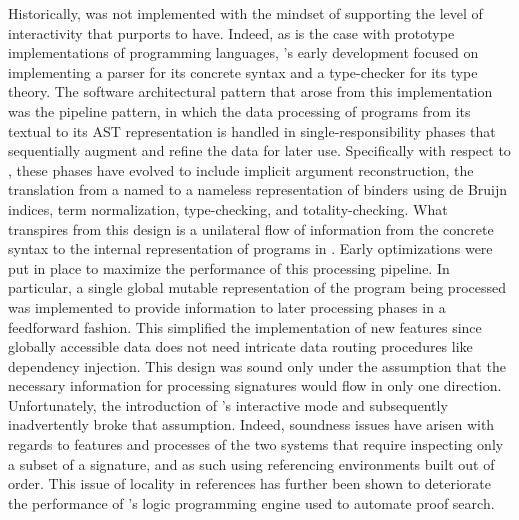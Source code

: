 Historically, \Beluga was not implemented with the mindset of supporting the level of interactivity that \Harpoon purports to have.
Indeed, as is the case with prototype implementations of programming languages, \Beluga's early development focused on implementing a parser for its concrete syntax and a type-checker for its type theory.
The software architectural pattern that arose from this implementation was the pipeline pattern, in which the data processing of programs from its textual to its \ac{AST} representation is handled in single-responsibility phases that sequentially augment and refine the data for later use.
Specifically with respect to \Beluga, these phases have evolved to include implicit argument reconstruction, the translation from a named to a nameless representation of binders using de Bruijn indices, term normalization, type-checking, and totality-checking.
What transpires from this design is a unilateral flow of information from the concrete syntax to the internal representation of programs in \Beluga.
Early optimizations were put in place to maximize the performance of this processing pipeline.
In particular, a single global mutable representation of the \Beluga program being processed was implemented to provide information to later processing phases in a feedforward fashion.
This simplified the implementation of new features since globally accessible data does not need intricate data routing procedures like dependency injection.
This design was sound only under the assumption that the necessary information for processing \Beluga signatures would flow in only one direction.
Unfortunately, the introduction of \Beluga's interactive mode and subsequently \Harpoon inadvertently broke that assumption.
Indeed, soundness issues have arisen with regards to features and processes of the two systems that require inspecting only a subset of a signature, and as such using referencing environments built out of order.
This issue of locality in references has further been shown to deteriorate the performance of \Beluga's logic programming engine used to automate proof search.


